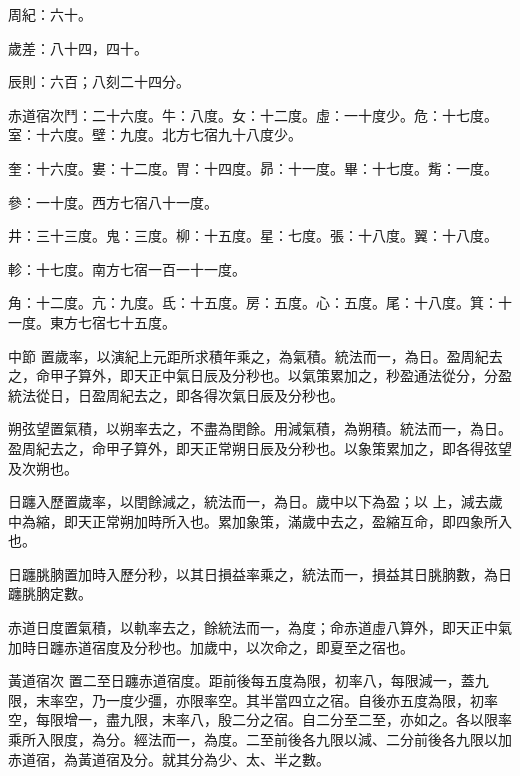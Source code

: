 \begin{pinyinscope}
 周紀：六十。



 歲差：八十四，四十。



 辰則：六百；八刻二十四分。



 赤道宿次鬥：二十六度。牛：八度。女：十二度。虛：一十度少。危：十七度。室：十六度。壁：九度。北方七宿九十八度少。



 奎：十六度。婁：十二度。胃：十四度。昴：十一度。畢：十七度。觜：一度。



 參：一十度。西方七宿八十一度。



 井：三十三度。鬼：三度。柳：十五度。星：七度。張：十八度。翼：十八度。



 軫：十七度。南方七宿一百一十一度。



 角：十二度。亢：九度。氐：十五度。房：五度。心：五度。尾：十八度。箕：十一度。東方七宿七十五度。



 中節
 置歲率，以演紀上元距所求積年乘之，為氣積。統法而一，為日。盈周紀去之，命甲子算外，即天正中氣日辰及分秒也。以氣策累加之，秒盈通法從分，分盈統法從日，日盈周紀去之，即各得次氣日辰及分秒也。



 朔弦望置氣積，以朔率去之，不盡為閏餘。用減氣積，為朔積。統法而一，為日。盈周紀去之，命甲子算外，即天正常朔日辰及分秒也。以象策累加之，即各得弦望及次朔也。



 日躔入歷置歲率，以閏餘減之，統法而一，為日。歲中以下為盈；以
 上，減去歲中為縮，即天正常朔加時所入也。累加象策，滿歲中去之，盈縮互命，即四象所入也。



 日躔朓朒置加時入歷分秒，以其日損益率乘之，統法而一，損益其日朓朒數，為日躔朓朒定數。



 赤道日度置氣積，以軌率去之，餘統法而一，為度；命赤道虛八算外，即天正中氣加時日躔赤道宿度及分秒也。加歲中，以次命之，即夏至之宿也。



 黃道宿次
 置二至日躔赤道宿度。距前後每五度為限，初率八，每限減一，蓋九限，末率空，乃一度少彊，亦限率空。其半當四立之宿。自後亦五度為限，初率空，每限增一，盡九限，末率八，殷二分之宿。自二分至二至，亦如之。各以限率乘所入限度，為分。經法而一，為度。二至前後各九限以減、二分前後各九限以加赤道宿，為黃道宿及分。就其分為少、太、半之數。




\end{pinyinscope}
